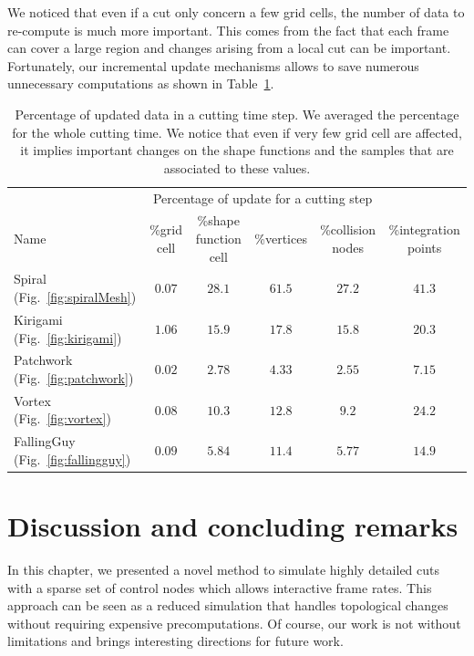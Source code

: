 We noticed that even if a cut only concern a few grid cells, the number of data to re-compute is much more important. This comes from the fact that each frame can cover a large region and changes arising from a local cut can be important. Fortunately, our incremental update mechanisms allows to save numerous unnecessary computations as shown in Table~\ref{tab:incrementalUpdate}. 

\begin{table}[!h]
	\centering
	\scalebox{0.7}
	{
		\begin{tabular}{l|ccccc}
			& \multicolumn{4}{c}{Percentage of update for a cutting step} \\
			Name & \%grid cell &\%shape function cell & \%vertices & \%collision nodes & \%integration points \\ \hline
			Spiral (Fig.~\ref{fig:spiralMesh}) & $0.07$ & $28.1$ & $61.5$ & $27.2$ & $41.3$\\
			Kirigami (Fig.~\ref{fig:kirigami}) & $1.06$ & $15.9$ & $17.8$ & $15.8$ & $20.3$\\
			Patchwork (Fig.~\ref{fig:patchwork}) & $0.02$ & $2.78$ & $4.33$ & $2.55$ & $7.15$\\
			Vortex (Fig.~\ref{fig:vortex}) & $0.08$ & $10.3$ & $12.8$ & $9.2$ & $24.2$\\
			FallingGuy (Fig.~\ref{fig:fallingguy}) & $0.09$ & $5.84$ & $11.4$ & $5.77$ & $14.9$\\
		\end{tabular}
	}
	\caption[Frame-based cutting: Incremental update timings]{\label{tab:incrementalUpdate} Percentage of updated data in a cutting time step. We averaged the percentage for the whole cutting time. We notice that even if very few grid cell are affected, it implies important changes on the shape functions and the samples that are associated to these values.}
\end{table}

\section{Discussion and concluding remarks} 
\label{sec:cutting_conclusion}

In this chapter, we presented a novel method to simulate highly detailed cuts with a sparse set of control nodes which allows interactive frame rates. This approach can be seen as a reduced simulation that handles topological changes without requiring expensive precomputations. Of course, our work is not without limitations and brings interesting directions for future work.

